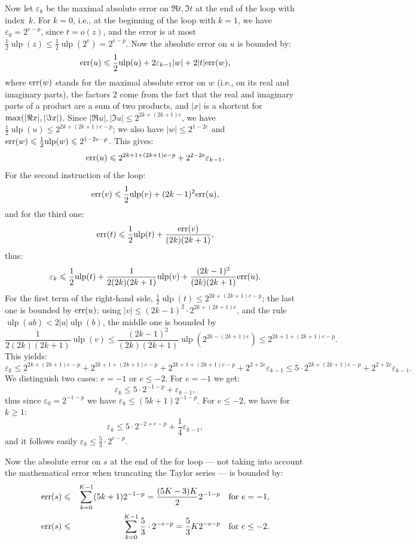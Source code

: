 \documentclass [11pt]{article}
\newcommand {\Ulp}{{\operatorname {ulp}}}
\renewcommand {\leq}{\leqslant}
\renewcommand {\geq}{\geqslant}
\begin{document}
Now let $\varepsilon_k$ be the maximal absolute error on $\Re t, \Im t$ at the
end of the loop with index~$k$.
For $k=0$, i.e., at the beginning of the loop with $k=1$, we have
$\varepsilon_0 = 2^{e-p}$, since $t = o(z)$, and the error is at most
$\frac{1}{2} \Ulp(z) \leq \frac{1}{2} \Ulp(2^e) = 2^{e-p}$.
Now the absolute error on $u$ is bounded by:
\[ {\rm err}(u) \leq \frac{1}{2} \Ulp(u) + 2 \varepsilon_{k-1} |w| + 2 |t| {\rm err}(w), \]
where ${\rm err}(w)$ stands for the maximal absolute error on $w$ (i.e.,
on its real and imaginary parts), the factors $2$ come from the fact
that the real and imaginary parts of a product are a sum of two products,
and $|x|$ is a shortcut for ${\rm max}(|\Re x|, |\Im x|)$.
Since $|\Re u|, |\Im u| \leq 2^{2k+(2k+1)e}$, we have
$\frac{1}{2} \Ulp(u) \leq 2^{2k+(2k+1)e-p}$;
we also have $|w| \leq 2^{1-2e}$ and ${\rm err}(w) \leq \frac{1}{2}
\Ulp(w) \leq 2^{1-2e-p}$. This gives:
\[ {\rm err}(u) \leq 2^{2k+1+(2k+1)e-p} + 2^{2-2e} \varepsilon_{k-1}. \]
For the second instruction of the loop:
\[ {\rm err}(v) \leq \frac{1}{2} \Ulp(v) + (2k-1)^2 {\rm err}(u), \]
and for the third one:
\[ {\rm err}(t) \leq \frac{1}{2} \Ulp(t) + \frac{{\rm err}(v)}{(2k)(2k+1)}, \]
thus:
\[ \varepsilon_k \leq \frac{1}{2} \Ulp(t) +
  \frac{1}{2(2k)(2k+1)} \Ulp(v) + \frac{(2k-1)^2}{(2k)(2k+1)} {\rm err}(u). \]
For the first term of the right-hand side,
$\frac{1}{2} \Ulp(t) \leq 2^{2k+(2k+1)e-p}$;
the last one is bounded by ${\rm err}(u)$;
using $|v| \leq (2k-1)^2 \cdot 2^{2k+(2k+1)e}$, and
the rule $\Ulp(ab) < 2 |a| \Ulp(b)$,
the middle one is bounded by
\[ \frac{1}{2(2k)(2k+1)} \Ulp(v) \leq
  \frac{(2k-1)^2}{(2k)(2k+1)} \Ulp(2^{2k-(2k+1)e})
  \leq 2^{2k+1+(2k+1)e-p}. \]
This yields:
\[ \varepsilon_k \leq 2^{2k+(2k+1)e-p} + 2^{2k+1+(2k+1)e-p}
  + 2^{2k+1+(2k+1)e-p} + 2^{2+2e} \varepsilon_{k-1}
  \leq 5 \cdot 2^{2k+(2k+1)e-p} + 2^{2+2e} \varepsilon_{k-1}. \]
We distinguish two cases: $e=-1$ or $e \leq -2$.
For $e=-1$ we get:
\[ \varepsilon_k \leq 5 \cdot 2^{-1-p} + \varepsilon_{k-1}, \]
thus since $\varepsilon_0 = 2^{-1-p}$ we have
$\varepsilon_k \leq (5k+1) 2^{-1-p}$.
For $e \leq -2$, we have for $k \geq 1$:
\[ \varepsilon_k \leq 5 \cdot 2^{-2+e-p} + \frac{1}{4} \varepsilon_{k-1}, \]
and it follows easily $\varepsilon_k \leq \frac{5}{3} \cdot 2^{e-p}$.

Now the absolute error on $s$ at the end of the for loop --- not taking into
account the mathematical error when truncating the Taylor series ---
is bounded by:
\begin{eqnarray}
{\rm err}(s) &\leq& \sum_{k=0}^{K-1} (5k+1) 2^{-1-p} = \frac{(5K-3)K}{2} 2^{-1-p} \quad \mbox{for $e=-1$}, \label{eq:asin1} \\
{\rm err}(s) &\leq& \sum_{k=0}^{K-1} \frac{5}{3} \cdot 2^{-e-p} =
  \frac{5}{3} K 2^{-e-p} \quad \mbox{for $e \le -2$}. \label{eq:asin2}
\end{eqnarray}
\end{document}

